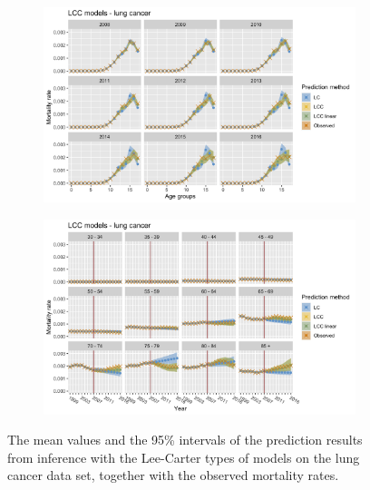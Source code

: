 \begin{figure}[h!]
    \centering
    \begin{subfigure}[b]{.45\linewidth}
        \includegraphics[width=\linewidth]{real-data/real-data-univariate/Figures/univariate-LCC-by-age-lung.png}
    \end{subfigure}
    \begin{subfigure}[b]{.45\linewidth}
        \includegraphics[width=\linewidth]{real-data/real-data-univariate/Figures/univariate-LCC-by-period-lung.png}
    \end{subfigure}
    \caption{The mean values and the 95\% intervals of the prediction results from inference with the Lee-Carter types of models on the lung cancer data set, together with the observed mortality rates. }
    \label{fig:uv-LCC-lung}
\end{figure}

